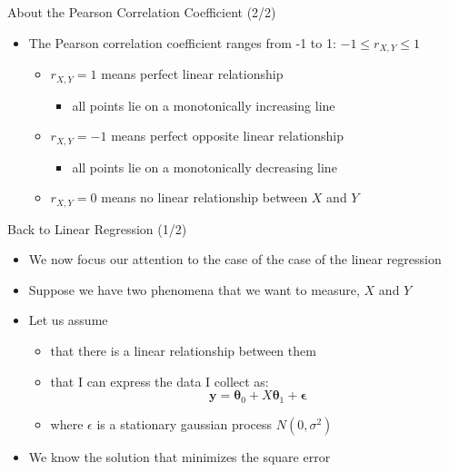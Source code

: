\documentclass{beamer}
\begin{document}
\begin{frame}
{\centerline{About the Pearson Correlation Coefficient (2/2)}}

\begin{itemize}
\item The Pearson correlation coefficient ranges from -1 to 1: $-1 \leq r_{X,Y} \leq 1$
\begin{itemize}
\item $ r_{X,Y}=1$ means perfect linear relationship
\begin{itemize}
\item all points lie on a monotonically increasing line
\end{itemize}
\item $ r_{X,Y}=-1$ means perfect opposite linear relationship
\begin{itemize}
\item all points lie on a monotonically decreasing line
\end{itemize}
\item $ r_{X,Y}= 0$ means no linear relationship between $X$ and $Y$
\end{itemize}
\end{itemize}

\end{frame}


\begin{frame}
{\centerline{Back to Linear Regression (1/2)}}
\begin{itemize}
\item We now focus our attention to the case of the case of the linear regression
\item Suppose we have two phenomena that we want to measure,  $X$ and $Y$
\item Let us assume 
\begin{itemize}
\item that there is a linear relationship between them
\item that I can express the data I collect as:
$$ \boldsymbol y = \boldsymbol \theta_0 + X  \boldsymbol \theta_1 + \boldsymbol \epsilon $$
\item where $\epsilon$ is a stationary gaussian process $N(0,\sigma^2)$
\end{itemize}
\item We know the solution that minimizes the square error
\end{itemize}
\end{frame}
\end{document}

